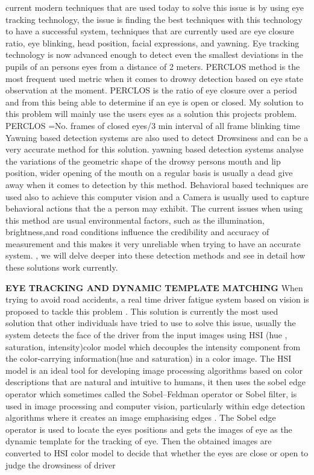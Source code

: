current modern techniques that are used today to solve this issue is by using eye tracking technology, the issue is finding the best techniques with this technology to have a successful system, techniques that are currently used are  eye closure
ratio, eye blinking, head position, facial expressions, and yawning. Eye tracking technology is now advanced enough to detect even the smallest deviations in the pupils of an persons eyes from a distance of 2 meters. PERCLOS method is the most frequent used metric when it comes to drowsy detection based on eye state observation at the moment. PERCLOS is the ratio of eye closure over a period and from this being able to determine if an eye is open or closed. My solution to this problem will mainly use the users eyes as a solution this projects problem. 
PERCLOS =No. frames of closed eyes/3 min interval of all frame blinking time
Yawning based detection systems are also used to detect Drowsiness and can be a very accurate method for this solution. yawning based detection systems analyse the variations of the geometric shape of the drowsy persons mouth and lip position, wider opening of the mouth on a regular basis is usually a dead give away when it comes to detection by this method.
Behavioral based techniques are used also to achieve this computer vision and a Camera is usually used to capture behavioral actions that the a person may exhibit. The current issues when using this method are usual environmental factors, such as the illumination, brightness,and road conditions influence the credibility and accuracy of measurement and this makes it very unreliable when trying to have an accurate system. \cite{ramzan2019survey}, we will delve deeper into these detection methods and see in detail how these solutions work currently.

\textbf{ EYE TRACKING AND DYNAMIC TEMPLATE MATCHING}
 When trying to avoid road accidents, a real time driver fatigue system based on vision is proposed to tackle this problem \cite{ramzan2019survey}. This solution is currently the most used solution that other individuals have tried to use to solve this issue, usually the system detects  the face of the driver from the input images using HSI (hue , saturation, intensity)color model which  decouples the intensity component from the color-carrying information(hue and saturation) in a color image. The HSI model is an ideal tool for developing image processing algorithms based on color descriptions that are natural and intuitive to humans, it then uses the sobel edge operator which sometimes called the Sobel–Feldman operator or Sobel filter, is used in image processing and computer vision, particularly within edge detection algorithms where it creates an image emphasising edges \cite{ramzan2019survey}.  The Sobel edge operator is used to locate the eyes positions and gets the images of eye as the dynamic template for the tracking of eye. Then the obtained images are converted to HSI color model to decide that whether the eyes are close or open to judge the drowsiness of driver

